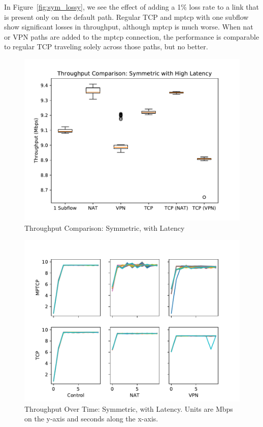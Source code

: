 \documentclass{cwru}
\begin{document}
In Figure~\ref{fig:sym_lossy}, we see the effect of adding a 1\% loss rate to a
link that is present only on the default path. Regular TCP and \ac{mptcp} with
one subflow show significant losses in throughput, although \ac{mptcp} is much
worse. When \ac{nat} or VPN paths are added to the \ac{mptcp} connection, the
performance is comparable to regular TCP traveling solely across those paths,
but no better.

\begin{figure}[p]
  \centering
  \includegraphics[height=0.42\textheight]{figures/sym-delayed.pdf}
  \caption{Throughput Comparison: Symmetric, with Latency}
  \label{fig:sym_delayed}
\end{figure}

\begin{figure}[p]
  \centering
  \includegraphics[height=0.42\textheight]{figures/timegrid-sym-delayed.pdf}
  \caption[Throughput Over Time: Symmetric, with Latency]{Throughput Over Time:
    Symmetric, with Latency. Units are Mbps on the y-axis and seconds along the
    x-axis.}
  \label{fig:timegrid_sym_delayed}
\end{figure}
\end{document}
